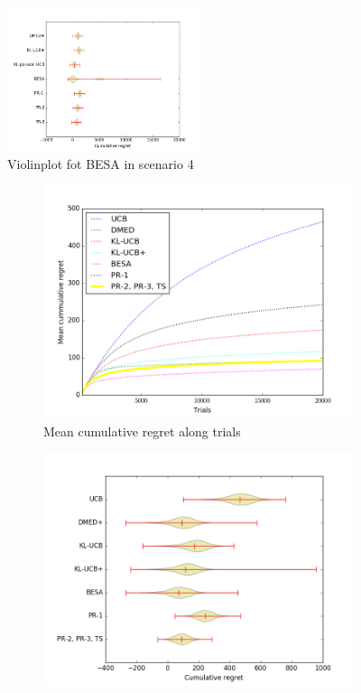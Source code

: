 \begin{figure}[!htb]
	\centering
	\includegraphics[width=0.5\textwidth]{recursos/Figure2}
	\caption{Violinplot fot BESA in scenario 4}
	\label{fig:violin_besa_escenario4}
\end{figure}

\begin{figure}[!htb]
    \centering
    \begin{subfigure}[b]{0.5\textwidth}
        \includegraphics[width=\textwidth]{recursos/Figure1a}
        \caption{Mean cumulative regret along trials}
        \label{fig:Bernoulli1_semilog}
    \end{subfigure}
    \begin{subfigure}[b]{0.5\textwidth}
        \includegraphics[width=\textwidth]{recursos/Figure1b}

\end{subfigure}
\end{figure}
